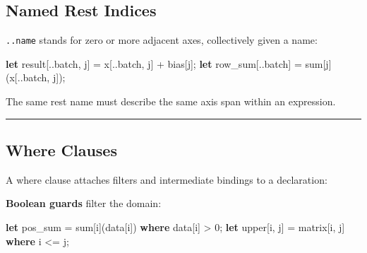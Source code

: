 \documentclass[11pt,]{article}
\newenvironment{Shaded}{}{}
\newcommand{\DecValTok}[1]{\textcolor[rgb]{0.25,0.63,0.44}{#1}}
\newcommand{\KeywordTok}[1]{\textcolor[rgb]{0.00,0.44,0.13}{\textbf{#1}}}
\newcommand{\NormalTok}[1]{#1}
\newcommand{\OperatorTok}[1]{\textcolor[rgb]{0.40,0.40,0.40}{#1}}
\begin{document}
\hypertarget{named-rest-indices}{%
\subsection{Named Rest Indices}\label{named-rest-indices}}

\texttt{..name} stands for zero or more adjacent axes, collectively
given a name:

\begin{Shaded}
\begin{Highlighting}[]
\KeywordTok{let}\NormalTok{ result}\OperatorTok{[}\NormalTok{..batch, j}\OperatorTok{]}\NormalTok{ = x}\OperatorTok{[}\NormalTok{..batch, j}\OperatorTok{]}\NormalTok{ + bias}\OperatorTok{[}\NormalTok{j}\OperatorTok{]}\NormalTok{;}
\KeywordTok{let}\NormalTok{ row_sum}\OperatorTok{[}\NormalTok{..batch}\OperatorTok{]}\NormalTok{ = sum}\OperatorTok{[}\NormalTok{j}\OperatorTok{]}\NormalTok{(x}\OperatorTok{[}\NormalTok{..batch, j}\OperatorTok{]}\NormalTok{);}
\end{Highlighting}
\end{Shaded}

The same rest name must describe the same axis span within an
expression.

\begin{center}\rule{0.5\linewidth}{0.4pt}\end{center}

\hypertarget{where-clauses}{%
\subsection{Where Clauses}\label{where-clauses}}

A where clause attaches filters and intermediate bindings to a
declaration:

\textbf{Boolean guards} filter the domain:

\begin{Shaded}
\begin{Highlighting}[]
\KeywordTok{let}\NormalTok{ pos_sum = sum}\OperatorTok{[}\NormalTok{i}\OperatorTok{]}\NormalTok{(data}\OperatorTok{[}\NormalTok{i}\OperatorTok{]}\NormalTok{) }\KeywordTok{where}\NormalTok{ data}\OperatorTok{[}\NormalTok{i}\OperatorTok{]}\NormalTok{ > }\DecValTok{0}\NormalTok{;}
\KeywordTok{let}\NormalTok{ upper}\OperatorTok{[}\NormalTok{i, j}\OperatorTok{]}\NormalTok{ = matrix}\OperatorTok{[}\NormalTok{i, j}\OperatorTok{]} \KeywordTok{where}\NormalTok{ i <= j;}
\end{Highlighting}
\end{Shaded}
\end{document}
